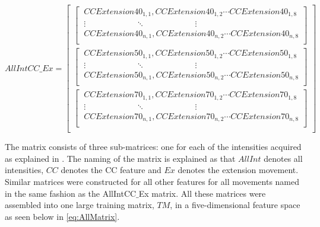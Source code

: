 \begin{equation} \label{eq:CCMatrix}
AllIntCC\_Ex=\begin{bmatrix} 
\begin{bmatrix}
\ CCExtension40_{1,1}, CCExtension40_{1,2} \cdots CCExtension40_{1,8} \\ 
\ \vdots \qquad \qquad \qquad \ddots \qquad \qquad \qquad \vdots \\
\ CCExtension40_{n,1}, CCExtension40_{n,2}  \cdots CCExtension40_{n,8} \\ \end{bmatrix} \\
\begin{bmatrix} 
\ CCExtension50_{1,1}, CCExtension50_{1,2} \cdots CCExtension50_{1,8} \\
\ \vdots \qquad \qquad \qquad \ddots \qquad \qquad \qquad \vdots \\
\ CCExtension50_{n,1}, CCExtension50_{n,2} \cdots CCExtension50_{n,8} \\ \end{bmatrix} \\
\begin{bmatrix} 
\ CCExtension70_{1,1}, CCExtension70_{1,2} \cdots CCExtension70_{1,8} \\
\ \vdots \qquad \qquad \qquad \ddots \qquad \qquad \qquad \vdots \\
\ CCExtension70_{n,1}, CCExtension70_{n,2} \cdots CCExtension70_{n,8} \\ \end{bmatrix} \\
\end{bmatrix}
\end{equation}

The matrix consists of three sub-matrices: one for each of the intensities acquired as explained in . The naming of the matrix is explained as that $AllInt$ denotes all intensities, $CC$ denotes the CC feature and $Ex$ denotes the extension movement. Similar matrices were constructed for all other features for all movements named in the same fashion as the AllIntCC$\_$Ex matrix. All these matrices were assembled into one large training matrix, $TM$, in a five-dimensional feature space as seen below in \eqref{eq:AllMatrix}. 


